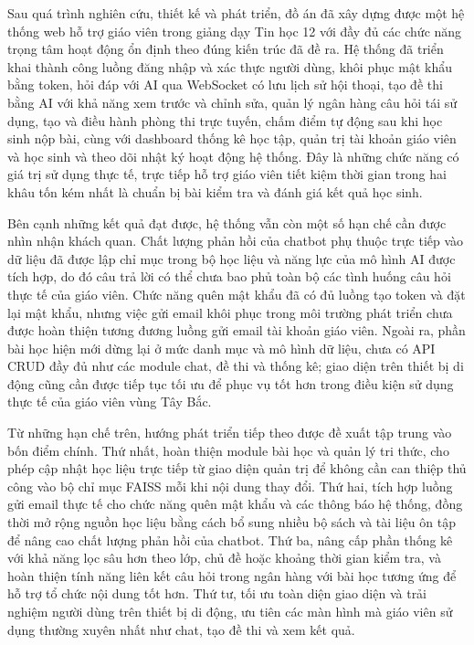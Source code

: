 \documentclass[12pt,a4paper]{article}
\begin{document}
	Sau quá trình nghiên cứu, thiết kế và phát triển, đồ án đã xây dựng được một hệ thống web hỗ trợ giáo viên trong giảng dạy Tin học 12 với đầy đủ các chức năng trọng tâm hoạt động ổn định theo đúng kiến trúc đã đề ra. Hệ thống đã triển khai thành công luồng đăng nhập và xác thực người dùng, khôi phục mật khẩu bằng token, hỏi đáp với AI qua WebSocket có lưu lịch sử hội thoại, tạo đề thi bằng AI với khả năng xem trước và chỉnh sửa, quản lý ngân hàng câu hỏi tái sử dụng, tạo và điều hành phòng thi trực tuyến, chấm điểm tự động sau khi học sinh nộp bài, cùng với dashboard thống kê học tập, quản trị tài khoản giáo viên và học sinh và theo dõi nhật ký hoạt động hệ thống. Đây là những chức năng có giá trị sử dụng thực tế, trực tiếp hỗ trợ giáo viên tiết kiệm thời gian trong hai khâu tốn kém nhất là chuẩn bị bài kiểm tra và đánh giá kết quả học sinh.
	
	Bên cạnh những kết quả đạt được, hệ thống vẫn còn một số hạn chế cần được nhìn nhận khách quan. Chất lượng phản hồi của chatbot phụ thuộc trực tiếp vào dữ liệu đã được lập chỉ mục trong bộ học liệu và năng lực của mô hình AI được tích hợp, do đó câu trả lời có thể chưa bao phủ toàn bộ các tình huống câu hỏi thực tế của giáo viên. Chức năng quên mật khẩu đã có đủ luồng tạo token và đặt lại mật khẩu, nhưng việc gửi email khôi phục trong môi trường phát triển chưa được hoàn thiện tương đương luồng gửi email tài khoản giáo viên. Ngoài ra, phần bài học hiện mới dừng lại ở mức danh mục và mô hình dữ liệu, chưa có API CRUD đầy đủ như các module chat, đề thi và thống kê; giao diện trên thiết bị di động cũng cần được tiếp tục tối ưu để phục vụ tốt hơn trong điều kiện sử dụng thực tế của giáo viên vùng Tây Bắc.
	
	Từ những hạn chế trên, hướng phát triển tiếp theo được đề xuất tập trung vào bốn điểm chính. Thứ nhất, hoàn thiện module bài học và quản lý tri thức, cho phép cập nhật học liệu trực tiếp từ giao diện quản trị để không cần can thiệp thủ công vào bộ chỉ mục FAISS mỗi khi nội dung thay đổi. Thứ hai, tích hợp luồng gửi email thực tế cho chức năng quên mật khẩu và các thông báo hệ thống, đồng thời mở rộng nguồn học liệu bằng cách bổ sung nhiều bộ sách và tài liệu ôn tập để nâng cao chất lượng phản hồi của chatbot. Thứ ba, nâng cấp phần thống kê với khả năng lọc sâu hơn theo lớp, chủ đề hoặc khoảng thời gian kiểm tra, và hoàn thiện tính năng liên kết câu hỏi trong ngân hàng với bài học tương ứng để hỗ trợ tổ chức nội dung tốt hơn. Thứ tư, tối ưu toàn diện giao diện và trải nghiệm người dùng trên thiết bị di động, ưu tiên các màn hình mà giáo viên sử dụng thường xuyên nhất như chat, tạo đề thi và xem kết quả.
	
\end{document}
